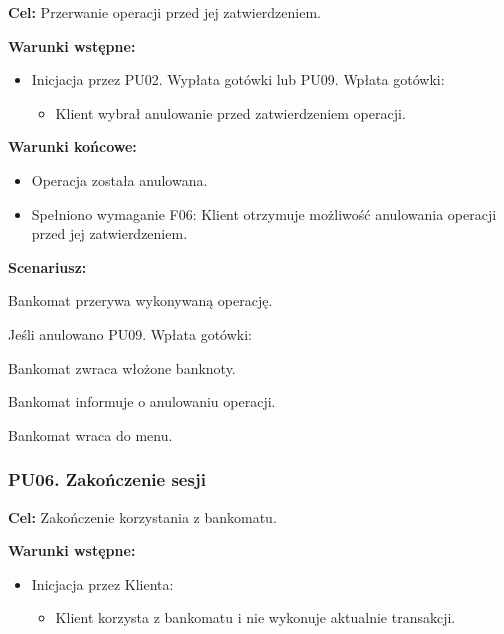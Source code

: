 \documentclass[10pt,a4paper]{article}
\begin{document}
\noindent\textbf{Cel:} Przerwanie operacji przed jej zatwierdzeniem.

\noindent\textbf{Warunki wstępne:}
\begin{itemize}
    \item Inicjacja przez PU02. Wypłata gotówki lub PU09. Wpłata gotówki:
    \begin{itemize}
        \item Klient wybrał anulowanie przed zatwierdzeniem operacji.
    \end{itemize}
\end{itemize}

\noindent\textbf{Warunki końcowe:}
\begin{itemize}
    \item Operacja została anulowana.
    \item Spełniono wymaganie F06: Klient otrzymuje możliwość anulowania operacji przed jej zatwierdzeniem.
\end{itemize}

\noindent\textbf{Scenariusz:}
\begin{scenariusz}
    \item Bankomat przerywa wykonywaną operację.
    \item Jeśli anulowano PU09. Wpłata gotówki:
    \begin{scenariusz}
        \item Bankomat zwraca włożone banknoty.
    \end{scenariusz}
    \item Bankomat informuje o anulowaniu operacji.
    \item Bankomat wraca do menu.
\end{scenariusz}


\subsubsection*{PU06. Zakończenie sesji}

\noindent\textbf{Cel:} Zakończenie korzystania z bankomatu.

\noindent\textbf{Warunki wstępne:}
\begin{itemize}
    \item Inicjacja przez Klienta:
    \begin{itemize}
        \item Klient korzysta z bankomatu i nie wykonuje aktualnie transakcji.
    \end{itemize}
\end{itemize}
\end{document}
